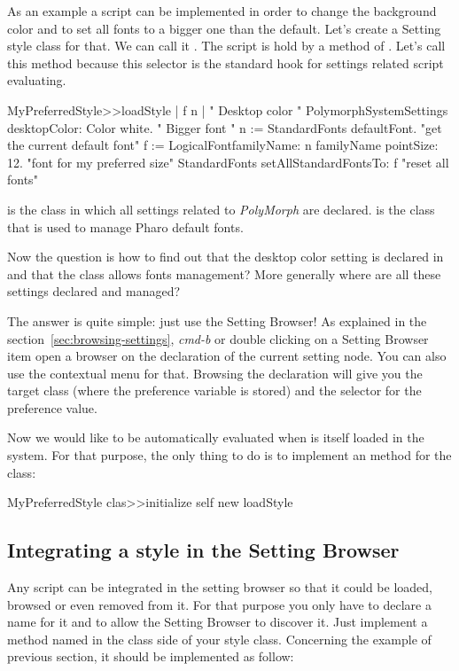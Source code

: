 \documentclass[a4paper,10pt,twoside]{book}
\begin{document}
{As an example a script can be implemented in order to change the background color and to set all fonts to a bigger one than the default. Let's create a Setting style class for that. We can call it . The script is hold by a method of . Let's call this method  because this selector is the standard hook for settings related script evaluating. 
\begin{code}{}
MyPreferredStyle>>loadStyle
	| f n |
	" Desktop color "
	PolymorphSystemSettings desktopColor: Color white.
	" Bigger font "
	n := StandardFonts defaultFont. "get the current default font"
	f := LogicalFontfamilyName: n familyName pointSize: 12. "font for my preferred size"
	StandardFonts setAllStandardFontsTo: f "reset all fonts"
\end{code}
 is the class in which all settings related to \textit{PolyMorph} are declared.  is the class that is used to manage Pharo default fonts.

Now the question is how to find out that the desktop color setting is declared in  and that the  class allows fonts management? More generally where are all these settings declared and managed? 

The answer is quite simple: just use the Setting Browser! As explained in the section~\ref{sec:browsing-settings}, \textit{cmd-b} or double clicking on a Setting Browser item open a browser on the declaration of the current setting node. You can also use the contextual menu for that. Browsing the declaration will give you the target class (where the preference variable is stored) and the selector for the preference value.

Now we would like  to be automatically evaluated when  is itself loaded in the system. For that purpose, the only thing to do is to implement an  method for the  class:
\begin{code}{}
MyPreferredStyle clas>>initialize
	self new loadStyle
\end{code}

\subsection{Integrating a style in the Setting Browser}
Any script can be integrated in the setting browser so that it could be loaded, browsed or even removed from it. For that purpose you only have to declare a name for it and to allow the Setting Browser to discover it. Just implement a method named  in the class side of your style class. Concerning the example of previous section, it should be implemented as follow:

}
\end{document}
